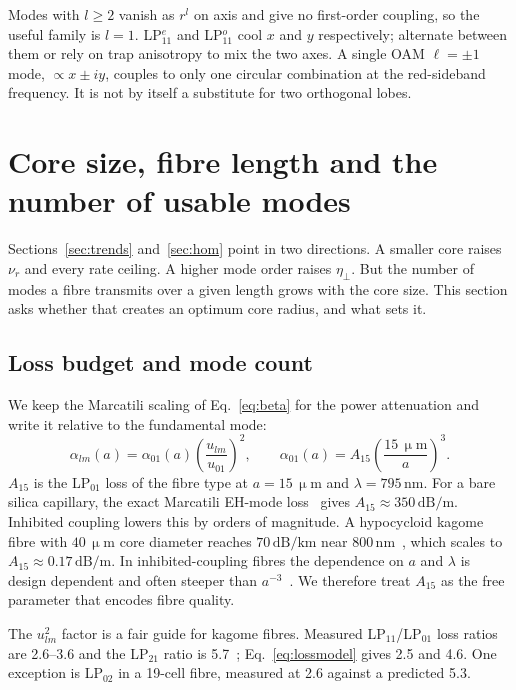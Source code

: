\documentclass[11pt,a4paper]{article}
\newcommand{\micrometre}{\upmu m}\newcommand{\microkelvin}{\upmu K}
\newcommand{\SI}[2]{\ensuremath{#1\,\mathrm{#2}}}
\newcommand{\etaeff}{\eta_{\perp}}
\begin{document}
Modes with $l\ge2$ vanish as $r^l$ on axis and give no first-order coupling, so the useful family is $l=1$. LP$_{11}^{e}$ and LP$_{11}^{o}$ cool $x$ and $y$ respectively; alternate between them or rely on trap anisotropy to mix the two axes. A single OAM $\ell=\pm1$ mode, $\propto x\pm iy$, couples to only one circular combination at the red-sideband frequency. It is not by itself a substitute for two orthogonal lobes.

\section{Core size, fibre length and the number of usable modes}
\label{sec:coresize}
Sections~\ref{sec:trends} and~\ref{sec:hom} point in two directions. A smaller core raises $\nu_r$ and every rate ceiling. A higher mode order raises $\etaeff$. But the number of modes a fibre transmits over a given length grows with the core size. This section asks whether that creates an optimum core radius, and what sets it.

\subsection{Loss budget and mode count}
We keep the Marcatili scaling of Eq.~\eqref{eq:beta} for the power attenuation and write it relative to the fundamental mode:
\begin{equation}
  \alpha_{lm}(a)=\alpha_{01}(a)\left(\frac{u_{lm}}{u_{01}}\right)^2,\qquad
  \alpha_{01}(a)=A_{15}\left(\frac{\SI{15}{\micrometre}}{a}\right)^3 .
  \label{eq:lossmodel}
\end{equation}
$A_{15}$ is the LP$_{01}$ loss of the fibre type at $a=\SI{15}{\micrometre}$ and $\lambda=\SI{795}{nm}$. For a bare silica capillary, the exact Marcatili EH-mode loss~\cite{marcatili1964} gives $A_{15}\approx\SI{350}{dB/m}$. Inhibited coupling lowers this by orders of magnitude. A hypocycloid kagome fibre with \SI{40}{\micrometre} core diameter reaches \SI{70}{dB/km} near \SI{800}{nm}~\cite{bradley2013}, which scales to $A_{15}\approx\SI{0.17}{dB/m}$. In inhibited-coupling fibres the dependence on $a$ and $\lambda$ is design dependent and often steeper than $a^{-3}$~\cite{fokoua2023,zeisberger2017}. We therefore treat $A_{15}$ as the free parameter that encodes fibre quality.

The $u_{lm}^2$ factor is a fair guide for kagome fibres. Measured LP$_{11}$/LP$_{01}$ loss ratios are 2.6--3.6 and the LP$_{21}$ ratio is 5.7~\cite{bradley2016}; Eq.~\eqref{eq:lossmodel} gives 2.5 and 4.6. One exception is LP$_{02}$ in a 19-cell fibre, measured at 2.6 against a predicted 5.3.
\end{document}
